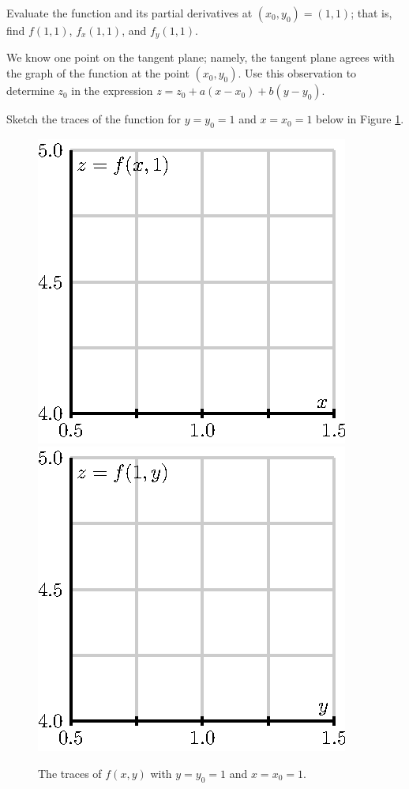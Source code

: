 \begin{activity} \label{A:10.4.10} 
\ba
\item Evaluate the function and its partial derivatives at $(x_0,y_0)
  = (1,1)$;  that is, find $f(1,1)$, $f_x(1,1)$, and $f_y(1,1)$.

\item We know one point on the tangent plane;  namely, the tangent
  plane agrees with the graph of the function at the point $(x_0,
  y_0)$.  Use this observation to determine $z_0$ in the expression
  $z = z_0 + a(x-x_0) + b(y-y_0)$.

\item Sketch the traces of the function for $y=y_0=1$ and $x=x_0=1$
  below in Figure \ref{F:10.4.traces}.  

  \begin{figure}[ht]
    \begin{center}
      \includegraphics{figures/fig_10_4_tangent_trace_y.eps}
      \hspace*{20pt}
      \includegraphics{figures/fig_10_4_tangent_trace_x.eps}
    \end{center}
    \caption{The traces of $f(x,y)$ with $y=y_0=1$ and $x=x_0=1$.}
    \label{F:10.4.traces}
  \end{figure}


\end{activity}
